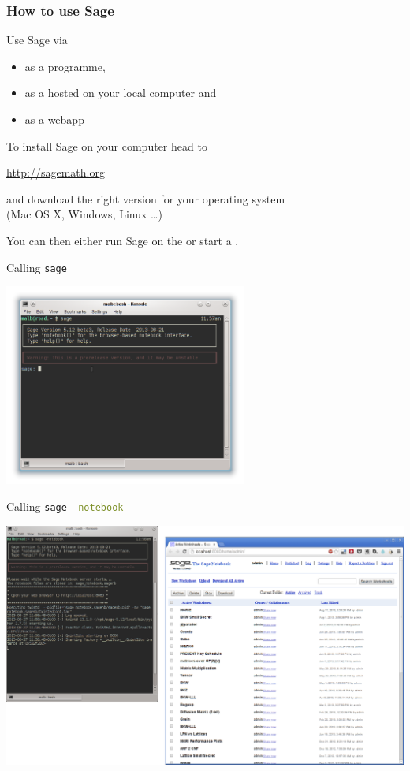 \documentclass[9pt]{beamer}
\newcommand{\memph}[1]{{\color{yellow9}{\bf #1}}\xspace}
\begin{document}
\begin{frame}
\frametitle{How to use Sage}

Use Sage via
\begin{itemize}
 \item as a \memph{command line} programme, 
 \item as a \memph{webapp} hosted on your local computer and 
 \item as a webapp \memph{on the Internet}
\end{itemize}

\framebreak

To install Sage on your computer head to 
\begin{center}
\url{http://sagemath.org} 
\end{center}

and download the right version for your operating system\\
(Mac OS X, Windows, Linux \dots)

\vspace{1em}

You can then either run Sage on the \memph{command line} or start a \memph{local webapp}.

\framebreak

Calling \lstinline[language=bash,basicstyle=\tt]|sage|

\begin{center}
\includegraphics[width=0.6\textwidth]{sage-cli.png}
\end{center}

\framebreak

Calling \lstinline[language=bash,basicstyle=\tt]|sage -notebook|

\begin{center}
\includegraphics[width=\textwidth]{sage-webapp.png}
\end{center}


\end{frame}
\end{document}
